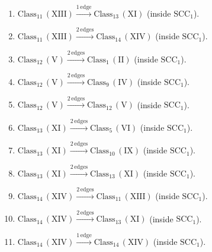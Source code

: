 \begin{enumerate}[leftmargin=*]
\item $\mathrm{Class}_{11}\,(\mathrm{XIII}) \xrightarrow{1\,\mathrm{edge}} \mathrm{Class}_{13}\,(\mathrm{XI})$ (inside $\mathrm{SCC}_{1}$).
\item $\mathrm{Class}_{11}\,(\mathrm{XIII}) \xrightarrow{2\,\mathrm{edges}} \mathrm{Class}_{14}\,(\mathrm{XIV})$ (inside $\mathrm{SCC}_{1}$).
\item $\mathrm{Class}_{12}\,(\mathrm{V}) \xrightarrow{2\,\mathrm{edges}} \mathrm{Class}_{1}\,(\mathrm{II})$ (inside $\mathrm{SCC}_{1}$).
\item $\mathrm{Class}_{12}\,(\mathrm{V}) \xrightarrow{2\,\mathrm{edges}} \mathrm{Class}_{9}\,(\mathrm{IV})$ (inside $\mathrm{SCC}_{1}$).
\item $\mathrm{Class}_{12}\,(\mathrm{V}) \xrightarrow{2\,\mathrm{edges}} \mathrm{Class}_{12}\,(\mathrm{V})$ (inside $\mathrm{SCC}_{1}$).
\item $\mathrm{Class}_{13}\,(\mathrm{XI}) \xrightarrow{2\,\mathrm{edges}} \mathrm{Class}_{5}\,(\mathrm{VI})$ (inside $\mathrm{SCC}_{1}$).
\item $\mathrm{Class}_{13}\,(\mathrm{XI}) \xrightarrow{2\,\mathrm{edges}} \mathrm{Class}_{10}\,(\mathrm{IX})$ (inside $\mathrm{SCC}_{1}$).
\item $\mathrm{Class}_{13}\,(\mathrm{XI}) \xrightarrow{2\,\mathrm{edges}} \mathrm{Class}_{13}\,(\mathrm{XI})$ (inside $\mathrm{SCC}_{1}$).
\item $\mathrm{Class}_{14}\,(\mathrm{XIV}) \xrightarrow{2\,\mathrm{edges}} \mathrm{Class}_{11}\,(\mathrm{XIII})$ (inside $\mathrm{SCC}_{1}$).
\item $\mathrm{Class}_{14}\,(\mathrm{XIV}) \xrightarrow{2\,\mathrm{edges}} \mathrm{Class}_{13}\,(\mathrm{XI})$ (inside $\mathrm{SCC}_{1}$).
\item $\mathrm{Class}_{14}\,(\mathrm{XIV}) \xrightarrow{1\,\mathrm{edge}} \mathrm{Class}_{14}\,(\mathrm{XIV})$ (inside $\mathrm{SCC}_{1}$).
\end{enumerate}

